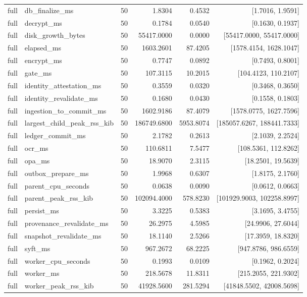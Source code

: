 \begin{tabular}{llrrrr}
full & db\_finalize\_ms & 50 & 1.8304 & 0.4532 & [1.7016, 1.9591] \\
full & decrypt\_ms & 50 & 0.1784 & 0.0540 & [0.1630, 0.1937] \\
full & disk\_growth\_bytes & 50 & 55417.0000 & 0.0000 & [55417.0000, 55417.0000] \\
full & elapsed\_ms & 50 & 1603.2601 & 87.4205 & [1578.4154, 1628.1047] \\
full & encrypt\_ms & 50 & 0.7747 & 0.0892 & [0.7493, 0.8001] \\
full & gate\_ms & 50 & 107.3115 & 10.2015 & [104.4123, 110.2107] \\
full & identity\_attestation\_ms & 50 & 0.3559 & 0.0320 & [0.3468, 0.3650] \\
full & identity\_revalidate\_ms & 50 & 0.1680 & 0.0430 & [0.1558, 0.1803] \\
full & ingestion\_to\_commit\_ms & 50 & 1602.9186 & 87.4079 & [1578.0775, 1627.7596] \\
full & largest\_child\_peak\_rss\_kib & 50 & 186749.6800 & 5953.8074 & [185057.6267, 188441.7333] \\
full & ledger\_commit\_ms & 50 & 2.1782 & 0.2613 & [2.1039, 2.2524] \\
full & ocr\_ms & 50 & 110.6811 & 7.5477 & [108.5361, 112.8262] \\
full & opa\_ms & 50 & 18.9070 & 2.3115 & [18.2501, 19.5639] \\
full & outbox\_prepare\_ms & 50 & 1.9968 & 0.6307 & [1.8175, 2.1760] \\
full & parent\_cpu\_seconds & 50 & 0.0638 & 0.0090 & [0.0612, 0.0663] \\
full & parent\_peak\_rss\_kib & 50 & 102094.4000 & 578.8230 & [101929.9003, 102258.8997] \\
full & persist\_ms & 50 & 3.3225 & 0.5383 & [3.1695, 3.4755] \\
full & provenance\_revalidate\_ms & 50 & 26.2975 & 4.5985 & [24.9906, 27.6044] \\
full & snapshot\_revalidate\_ms & 50 & 18.1140 & 2.5266 & [17.3959, 18.8320] \\
full & syft\_ms & 50 & 967.2672 & 68.2225 & [947.8786, 986.6559] \\
full & worker\_cpu\_seconds & 50 & 0.1993 & 0.0109 & [0.1962, 0.2024] \\
full & worker\_ms & 50 & 218.5678 & 11.8311 & [215.2055, 221.9302] \\
full & worker\_peak\_rss\_kib & 50 & 41928.5600 & 281.5294 & [41848.5502, 42008.5698] \\

\end{tabular}

